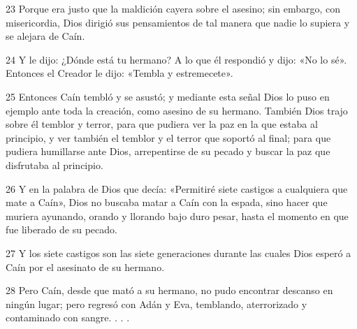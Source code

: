 \par 23 Porque era justo que la maldición cayera sobre el asesino; sin embargo, con misericordia, Dios dirigió sus pensamientos de tal manera que nadie lo supiera y se alejara de Caín.

\par 24 Y le dijo: ¿Dónde está tu hermano? A lo que él respondió y dijo: «No lo sé». Entonces el Creador le dijo: «Tembla y estremecete».

\par 25 Entonces Caín tembló y se asustó; y mediante esta señal Dios lo puso en ejemplo ante toda la creación, como asesino de su hermano. También Dios trajo sobre él temblor y terror, para que pudiera ver la paz en la que estaba al principio, y ver también el temblor y el terror que soportó al final; para que pudiera humillarse ante Dios, arrepentirse de su pecado y buscar la paz que disfrutaba al principio.

\par 26 Y en la palabra de Dios que decía: «Permitiré siete castigos a cualquiera que mate a Caín», Dios no buscaba matar a Caín con la espada, sino hacer que muriera ayunando, orando y llorando bajo duro pesar, hasta el momento en que fue liberado de su pecado.

\par 27 Y los siete castigos son las siete generaciones durante las cuales Dios esperó a Caín por el asesinato de su hermano.

\par 28 Pero Caín, desde que mató a su hermano, no pudo encontrar descanso en ningún lugar; pero regresó con Adán y Eva, temblando, aterrorizado y contaminado con sangre. . . .


